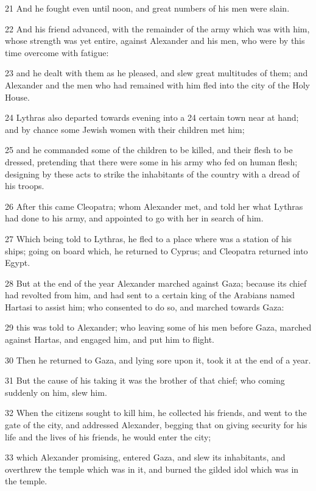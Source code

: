 21 And he fought even until noon, and great numbers of his men were slain. 

22 And his friend advanced, with the remainder of the army which was with him, whose strength was yet entire, against Alexander and his men, who were by this time overcome with fatigue: 

23 and he dealt with them as he pleased, and slew great multitudes of them; and Alexander and the men who had remained with him fled into the city of the Holy House. 

24 Lythras also departed towards evening into a 24 certain town near at hand; and by chance some Jewish women with their children met him;

25 and he commanded some of the children to be killed, and their flesh to be dressed, pretending that there were some in his army who fed on human flesh; designing by these acts to strike the inhabitants of the country with a dread of his troops. 

26 After this came Cleopatra; whom Alexander met, and told her what Lythras had done to his army, and appointed to go with her in search of him. 

27 Which being told to Lythras, he fled to a place where was a station of his ships; going on board which, he returned to Cyprus; and Cleopatra returned into Egypt.

28 But at the end of the year Alexander marched against Gaza; because its chief had revolted from him, and had sent to a certain king of the Arabians named Hartasi to assist him; who consented to do so, and marched towards Gaza: 

29 this was told to Alexander; who leaving some of his men before Gaza, marched against Hartas, and engaged him, and put him to flight. 

30 Then he returned to Gaza, and lying sore upon it, took it at the end of a year. 

31 But the cause of his taking it was the brother of that chief; who coming suddenly on him, slew him. 

32 When the citizens sought to kill him, he collected his friends, and went to the gate of the city, and addressed Alexander, begging that on giving security for his life and the lives of his friends, he would enter the city; 

33 which Alexander promising, entered Gaza, and slew its inhabitants, and overthrew the temple which was in it, and burned the gilded idol which was in the temple. 

